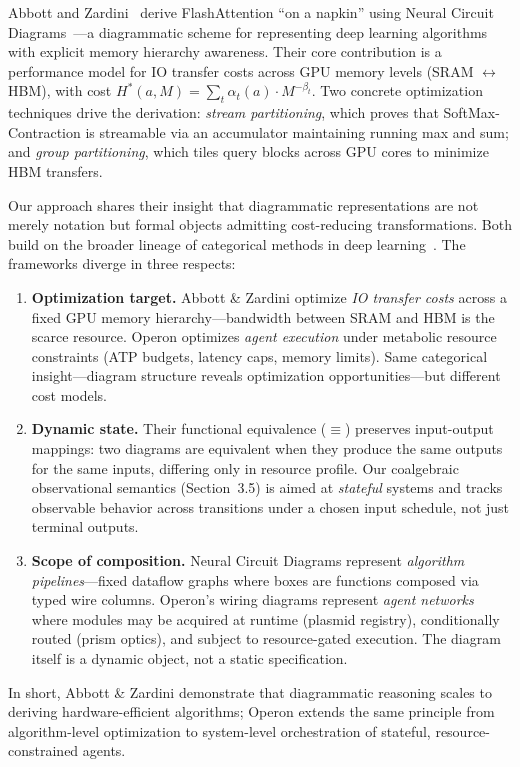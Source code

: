 Abbott and Zardini~\cite{abbott2025flashattention} derive FlashAttention
``on a napkin'' using Neural Circuit Diagrams~\cite{abbott2023neural}---a
diagrammatic scheme for representing deep learning algorithms with explicit
memory hierarchy awareness. Their core contribution is a performance model
for IO transfer costs across GPU memory levels (SRAM $\leftrightarrow$ HBM),
with cost $H^*(a, M) = \sum_t \alpha_t(a) \cdot M^{-\beta_t}$. Two
concrete optimization techniques drive the derivation: \emph{stream
partitioning}, which proves that SoftMax-Contraction is streamable via
an accumulator maintaining running max and sum; and \emph{group
partitioning}, which tiles query blocks across GPU cores to minimize
HBM transfers.

Our approach shares their insight that diagrammatic representations are
not merely notation but formal objects admitting cost-reducing
transformations. Both build on the broader lineage of categorical
methods in deep learning~\cite{fong2019seven}. The frameworks diverge
in three respects:

\begin{enumerate}[leftmargin=*]
\item \textbf{Optimization target.} Abbott \& Zardini optimize
\emph{IO transfer costs} across a fixed GPU memory hierarchy---bandwidth
between SRAM and HBM is the scarce resource. Operon optimizes
\emph{agent execution} under metabolic resource constraints (ATP budgets,
latency caps, memory limits). Same categorical insight---diagram structure
reveals optimization opportunities---but different cost models.

\item \textbf{Dynamic state.} Their functional equivalence ($\equiv$)
preserves input-output mappings: two diagrams are equivalent when they
produce the same outputs for the same inputs, differing only in resource
profile. Our coalgebraic observational semantics (Section~3.5) is aimed at
\emph{stateful} systems and tracks observable behavior across transitions
under a chosen input schedule, not just terminal outputs.

\item \textbf{Scope of composition.} Neural Circuit Diagrams represent
\emph{algorithm pipelines}---fixed dataflow graphs where boxes are
functions composed via typed wire columns. Operon's wiring diagrams
represent \emph{agent networks} where modules may be acquired at runtime
(plasmid registry), conditionally routed (prism optics), and subject to
resource-gated execution. The diagram itself is a dynamic object, not a
static specification.
\end{enumerate}

\noindent In short, Abbott \& Zardini demonstrate that diagrammatic
reasoning scales to deriving hardware-efficient algorithms; Operon extends
the same principle from algorithm-level optimization to system-level
orchestration of stateful, resource-constrained agents.
